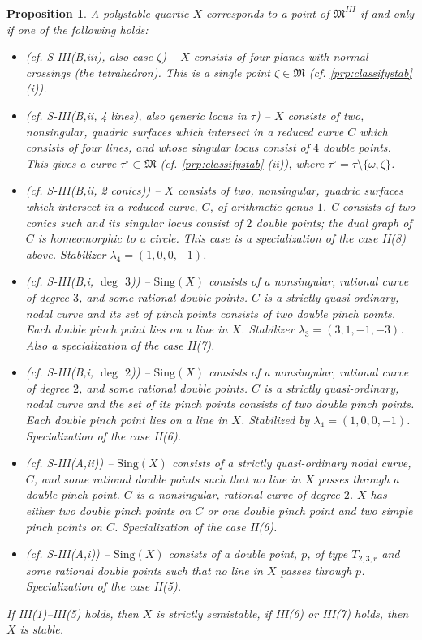 \documentclass[11pt]{amsart}
\numberwithin{equation}{section}
\theoremstyle{plain}
\newtheorem{proposition}[theorem]{Proposition}
\theoremstyle{remark}
\theoremstyle{definition}
\newcommand{\Sing}{\mathrm{Sing}}
\newcommand{\gM}{\mathfrak{M}}
\begin{document}
\begin{proposition}
A polystable quartic $X$ corresponds to a point of $\gM^{III}$ if and only if one of the following holds:
\begin{itemize}
\item[III(1)] (cf. S-III(B,iii), also case $\zeta$) -- $X$ consists of four planes with normal crossings (the tetrahedron). This is a single point $\zeta\in \gM$ (cf. \ref{prp:classifystab} (i)). 
\item[III(2)] (cf. S-III(B,ii, 4 lines), also generic locus in $\tau$) -- $X$ consists of two, nonsingular, quadric surfaces which intersect in a reduced curve $C$ which consists of four lines, and whose singular locus consist of $4$ double points. This gives a curve $\tau^\circ\subset  \gM$ (cf. \ref{prp:classifystab} (ii)), where $\tau^\circ=\tau\setminus\{\omega,\zeta\}$.  
\item[III(3)]  (cf. S-III(B,ii, 2 conics)) -- $X$ consists of two, nonsingular, quadric surfaces which intersect in a reduced curve, $C$, of arithmetic genus $1$. C consists of two  conics such and its singular locus consist of $2$ double points; the dual graph of $C$ is homeomorphic to a circle. This case is a specialization of the case II(8) above. Stabilizer $\lambda_4=(1,0,0,-1)$. 
\item[III(4)] (cf. S-III(B,i, $\deg$ $3$)) --  $\Sing(X)$ consists of a nonsingular, rational curve of degree $3$, and some rational double points. $C$ is a strictly quasi-ordinary, nodal curve and its set of pinch points consists of two double pinch points. Each double pinch point lies on a line in $X$. Stabilizer $\lambda_3=(3,1,-1,-3)$. Also a specialization of the case II(7). 
\item[III(5)]  (cf. S-III(B,i, $\deg$ $2$)) -- $\Sing(X)$ consists of a nonsingular, rational curve of degree $2$, and some rational double points. $C$ is a strictly quasi-ordinary, nodal curve and the set of its pinch points consists of two double pinch points. Each double pinch point lies on a line in $X$. Stabilized by $\lambda_4=(1,0,0,-1)$. Specialization of the case II(6). 
\item[III(6)]  (cf. S-III(A,ii)) -- $\Sing(X)$ consists of a strictly quasi-ordinary nodal curve, $C$, and some rational double points such that no line in $X$ passes through a double pinch point. $C$ is a nonsingular, rational curve of degree $2$. $X$ has either two double pinch points on $C$ or one double
pinch point and two simple pinch points on $C$. Specialization of the case II(6).

\item[III(7)]  (cf. S-III(A,i)) -- $\Sing(X)$ consists of a double point, $p$, of type $T_{2,3,r}$ and some rational double points such that no line in $X$ passes through $p$. Specialization of the case II(5). 
\end{itemize}
If III(1)--III(5) holds, then $X$ is strictly semistable, if  III(6) or III(7) holds, then $X$ is stable. 
\end{proposition}
\end{document}
